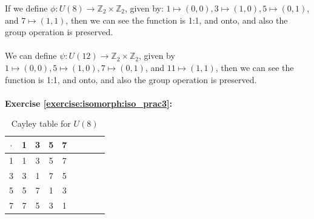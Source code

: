 \noindent If we define $\phi : U(8) \rightarrow {\mathbb Z}_2 \times {\mathbb Z}_2$, given by: $1\mapsto (0, 0), 3 \mapsto (1, 0), 5 \mapsto (0, 1)$, and $7 \mapsto (1, 1)$, then we can see the function is 1:1, and onto, and also the group operation is preserved. 
\\
\\
We can define $\psi: U(12) \rightarrow {\mathbb Z}_2 \times {\mathbb Z}_2$, given by $1\mapsto (0, 0), 5 \mapsto (1, 0), 7 \mapsto (0, 1)$, and $11 \mapsto (1, 1)$, then we can see the function is 1:1, and onto, and also the group operation is preserved. 
\\
\\

\noindent\textbf{Exercise \ref{exercise:isomorph:iso_prac3}:}
\begin{table}[H]
\caption{Cayley table for $U(8)$}
{\small
\begin{center}
\begin{tabular}{c|cccccccc}
$\cdot$ & 1 & 3 & 5 & 7  \\
\hline
1        & 1 & 3 & 5 & 7  \\
3       & 3 & 1 & 7 & 5  \\
5       & 5 & 7 & 1 & 3 \\
7       & 7 & 5 & 3 & 1 \\
\end{tabular}
\end{center}
}
\end{table}


